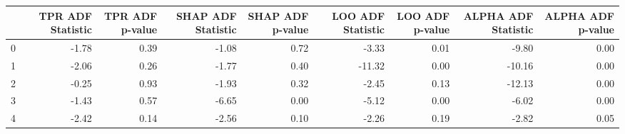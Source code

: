 \begin{tabular}{lrrrrrrrr}
\toprule
 & TPR ADF Statistic & TPR ADF p-value & SHAP ADF Statistic & SHAP ADF p-value & LOO ADF Statistic & LOO ADF p-value & ALPHA ADF Statistic & ALPHA ADF p-value \\
\midrule
0 & -1.78 & 0.39 & -1.08 & 0.72 & -3.33 & 0.01 & -9.80 & 0.00 \\
1 & -2.06 & 0.26 & -1.77 & 0.40 & -11.32 & 0.00 & -10.16 & 0.00 \\
2 & -0.25 & 0.93 & -1.93 & 0.32 & -2.45 & 0.13 & -12.13 & 0.00 \\
3 & -1.43 & 0.57 & -6.65 & 0.00 & -5.12 & 0.00 & -6.02 & 0.00 \\
4 & -2.42 & 0.14 & -2.56 & 0.10 & -2.26 & 0.19 & -2.82 & 0.05 \\
\bottomrule
\end{tabular}
